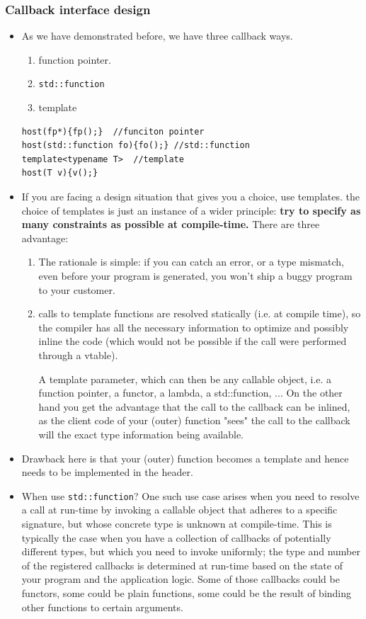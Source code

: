 \documentclass[a4paper,11pt,twoside]{book}
\begin{document}
\subsubsection{Callback interface design}
\begin{itemize}
	\item As we have demonstrated before, we have three callback ways.
	\begin{enumerate}
		\item function pointer.
		\item \texttt{std::function}
		\item template
	\end{enumerate}
\begin{lstlisting} 
host(fp*){fp();}  //funciton pointer
host(std::function fo){fo();} //std::function
template<typename T>  //template
host(T v){v();}
\end{lstlisting}
	
	\item If you are facing a design situation that gives you a choice, use templates. the choice of templates is just an instance of a wider principle: \textbf{try to specify as many constraints as possible at compile-time.} There are three advantage:
	\begin{enumerate}
		\item The rationale is simple: if you can catch an error, or a type mismatch, even before your program is generated, you won't ship a buggy program to your customer.
		
		\item calls to template functions are resolved statically (i.e. at compile time), so the compiler has all the necessary information to optimize and possibly inline the code (which would not be possible if the call were performed through a vtable).
		
		A template parameter, which can then be any callable object, i.e. a function pointer, a functor, a lambda, a std::function, ...  On the other hand you get the advantage that the call to the callback can be inlined, as the client code of your (outer) function "sees" the call to the callback will the exact type information being available.
	\end{enumerate}

	\item Drawback here is that your (outer) function becomes a template and hence needs to be implemented in the header.
	
	\item When use \texttt{std::function}? One such use case arises when you need to resolve a call at run-time by invoking a callable object that adheres to a specific signature, but whose concrete type is unknown at compile-time. This is typically the case when you have a collection of callbacks of potentially different types, but which you need to invoke uniformly; the type and number of the registered callbacks is determined at run-time based on the state of your program and the application logic. Some of those callbacks could be functors, some could be plain functions, some could be the result of binding other functions to certain arguments.
	

\end{itemize}
\end{document}
